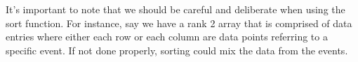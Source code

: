 It's important to note that we should be careful and deliberate when using the sort function. For instance, say we have a rank 2 array that is comprised of data entries where either each row or each column are data points referring to a specific event. If not done properly, sorting could mix the data from the events.